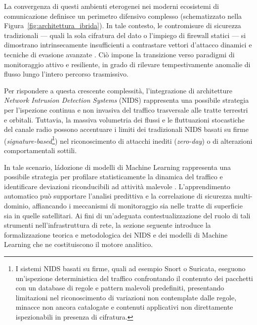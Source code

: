 La convergenza di questi ambienti eterogenei nei moderni ecosistemi di comunicazione definisce un perimetro difensivo complesso (schematizzato nella Figura~\ref{fig:architettura_ibrida}). 
In tale contesto, le contromisure di sicurezza tradizionali — quali la sola cifratura del dato o l'impiego di firewall statici — si dimostrano intrinsecamente insufficienti a contrastare vettori d'attacco dinamici e tecniche di evasione avanzate \cite{stallings2020}. 
Ciò impone la transizione verso paradigmi di monitoraggio attivo e resiliente, in grado di rilevare tempestivamente anomalie di flusso lungo l'intero percorso trasmissivo.

Per rispondere a questa crescente complessità, l'integrazione di architetture \textit{Network Intrusion Detection Systems} (NIDS) rappresenta una possibile strategia per l'ispezione continua e non invasiva del traffico trasversale alle tratte terrestri e orbitali. 
Tuttavia, la massiva volumetria dei flussi e le fluttuazioni stocastiche del canale radio possono accentuare i limiti dei tradizionali NIDS basati su firme (\textit{signature-based}\footnote{I sistemi NIDS basati su firme, quali ad esempio Snort o Suricata, eseguono un'ispezione deterministica del traffico confrontando il contenuto dei pacchetti con un database di regole e pattern malevoli predefiniti, presentando limitazioni nel riconoscimento di variazioni non contemplate dalle regole, minacce non ancora catalogate e contenuti applicativi non direttamente ispezionabili in presenza di cifratura.}) nel riconoscimento di attacchi inediti (\textit{zero-day}) o di alterazioni comportamentali sottili.

In tale scenario, l\'adozione di modelli di Machine Learning rappresenta una possibile strategia per profilare statisticamente la dinamica del traffico e identificare deviazioni riconducibili ad attività malevole \cite{khraisat2019}.
L'apprendimento automatico può supportare l'analisi predittiva e la correlazione di sicurezza multi-dominio, affiancando i meccanismi di monitoraggio sia nelle tratte di superficie sia in quelle satellitari. 
Ai fini di un'adeguata contestualizzazione del ruolo di tali strumenti nell'infrastruttura di rete, la sezione seguente introduce la formalizzazione teorica e metodologica dei NIDS e dei modelli di Machine Learning che ne costituiscono il motore analitico.

